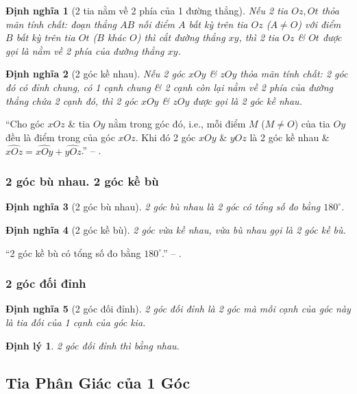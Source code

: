\documentclass{article}
\numberwithin{equation}{section}
\newtheorem{dinhnghia}{Định nghĩa}[section]
\newtheorem{dinhly}{Định lý}[section]
\begin{document}
\begin{dinhnghia}[2 tia nằm về 2 phía của 1 đường thẳng]
	Nếu 2 tia $Oz,Ot$ thỏa mãn tính chất: đoạn thẳng $AB$ nối điểm $A$ bất kỳ trên tia $Oz$ ($A\ne O$) với điểm $B$ bất kỳ trên tia $Ot$ ($B$ khác $O$) thì cắt đường thẳng $xy$, thì 2 tia $Oz$ \& $Ot$ được gọi là \emph{nằm về 2 phía} của đường thẳng $xy$.
\end{dinhnghia}

\begin{dinhnghia}[2 góc kề nhau]
	Nếu 2 góc $xOy$ \& $zOy$ thỏa mãn tính chất: 2 góc đó có đỉnh chung, có 1 cạnh chung \& 2 cạnh còn lại nằm về 2 phía của đường thẳng chứa 2 cạnh đó, thì 2 góc $xOy$ \& $zOy$ được gọi là \emph{2 góc kề nhau}.
\end{dinhnghia}
``Cho góc $xOz$ \& tia $Oy$ nằm trong góc đó, i.e., mỗi điểm $M$ ($M\ne O$) của tia $Oy$ đều là điểm trong của góc $xOz$. Khi đó 2 góc $xOy$ \& $yOz$ là 2 góc kề nhau \& $\widehat{xOz} = \widehat{xOy} + \widehat{yOz}$.'' -- \cite[p. 91]{SGK_Toan_7_Canh_Dieu_tap_1}.

\subsubsection{2 góc bù nhau. 2 góc kề bù}

\begin{dinhnghia}[2 góc bù nhau]
	\emph{2 góc bù nhau} là 2 góc có tổng số đo bằng $180^\circ$.
\end{dinhnghia}

\begin{dinhnghia}[2 góc kề bù]
	2 góc vừa kề nhau, vừa bù nhau gọi là \emph{2 góc kề bù}.
\end{dinhnghia}
``2 góc kề bù có tổng số đo bằng $180^\circ$.'' -- \cite[p. 92]{SGK_Toan_7_Canh_Dieu_tap_1}.

\subsubsection{2 góc đối đỉnh}

\begin{dinhnghia}[2 góc đối đỉnh]
	\emph{2 góc đối đỉnh} là 2 góc mà mỗi cạnh của góc này là tia đối của 1 cạnh của góc kia.
\end{dinhnghia}

\begin{dinhly}
	2 góc đối đỉnh thì bằng nhau.
\end{dinhly}

\subsection{Tia Phân Giác của 1 Góc}
\end{document}
